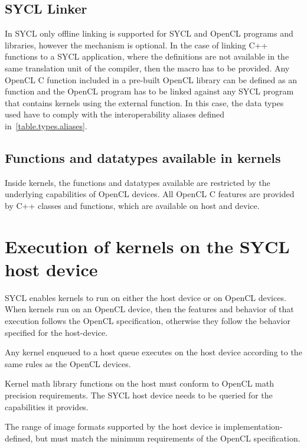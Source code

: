 \subsection{SYCL Linker}

In SYCL only offline linking is supported for SYCL and OpenCL programs
and libraries, however the mechanism is optional.
In the case of linking C++ functions to a SYCL application,
where the definitions are not available in the
same translation unit of the compiler, then the macro 
has to be provided.
Any OpenCL C function included in a pre-built OpenCL library can be
defined as an  function and the OpenCL program
has to be linked against any SYCL program that contains kernels using
the external function. In this case, the data types used have to comply with
the interoperability aliases defined in~\ref{table.types.aliases}.

\subsection{Functions and datatypes available in kernels}


Inside kernels, the functions and datatypes available are restricted by the
underlying capabilities of OpenCL devices. All OpenCL C features are provided
by C++ classes and functions, which are available on host and device.


\section{Execution of kernels on the SYCL host device}

SYCL enables kernels to run on either the host device or on OpenCL devices. When
kernels run on an OpenCL device, then the features and behavior of that
execution follows the OpenCL specification, otherwise they follow the behavior
specified for the \gls{host-device}.

Any kernel enqueued to a host queue executes on the host device according to the
same rules as the OpenCL devices.

Kernel math library functions on the host must conform to OpenCL math precision
requirements. The SYCL host device needs to be queried for the capabilities it provides.

The range of image formats supported by the host device is implementation-defined, 
but must match the minimum requirements of the OpenCL specification.

